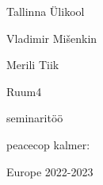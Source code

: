 \begin{titlepage}
\par{Tallinna Ülikool}
\vspace{0.3\textheight}
\par{Vladimir Mišenkin}
\par{Merili Tiik}
\vfill
\LARGE
\par{Ruum4}
\normalsize
\par{seminaritöö}
\vspace{0.3\textheight}
\begin{flushright}
\par{peacecop kalmer:}
\end{flushright}
\vfill
Europe
\hfill
2022-2023
\end{titlepage}
